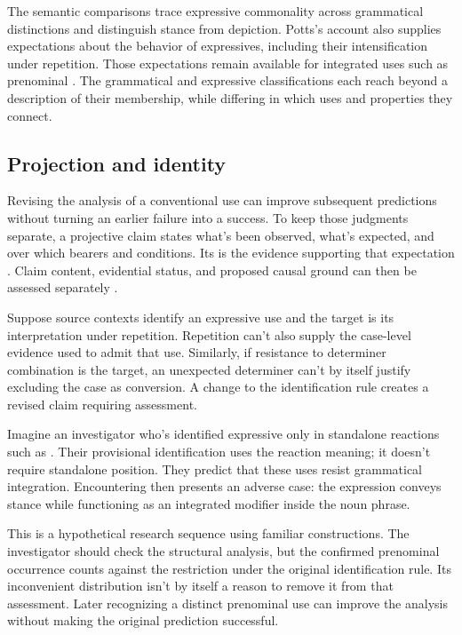 \documentclass[12pt]{article}
\begin{document}
The semantic comparisons trace expressive commonality across grammatical
distinctions and distinguish stance from depiction. Potts's account also
supplies expectations about the behavior of expressives, including their
intensification under repetition. Those expectations remain available for
integrated uses such as prenominal . The grammatical
and expressive classifications each reach beyond a description of their
membership, while differing in which uses and properties they connect.

\subsection{Projection and identity}

Revising the analysis of a conventional use can improve subsequent
predictions without turning an earlier failure into a success. To
keep those judgments separate, a projective claim states what's been
observed, what's expected, and over which bearers and conditions.
Its  is the evidence supporting that expectation
\citep{Goodman1955}. Claim content, evidential status, and proposed causal
ground can then be assessed separately
\citep[11--12]{reynolds2026projectibilityHistory}.

Suppose source contexts identify an expressive use and the target is
its interpretation under repetition. Repetition can't also supply the
case-level evidence used to admit that use. Similarly, if resistance
to determiner combination is the target, an unexpected determiner
can't by itself justify excluding the case as conversion. A change
to the identification rule creates a revised claim requiring assessment.

Imagine an investigator who's identified expressive 
only in standalone reactions such as . Their provisional identification uses the reaction meaning;
it doesn't require standalone position. They predict that these uses
resist grammatical integration. Encountering  then presents an adverse case: the expression conveys stance
while functioning as an integrated modifier inside the noun phrase.

This is a hypothetical research sequence using familiar constructions.
The investigator should check the structural analysis, but the confirmed
prenominal occurrence counts against the restriction under the original
identification rule. Its inconvenient distribution isn't by itself a
reason to remove it from that assessment. Later recognizing a distinct
prenominal use can improve the analysis without making the original
prediction successful.
\end{document}
